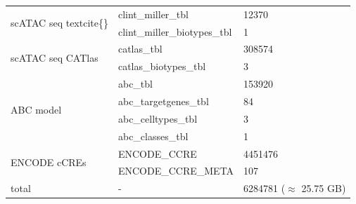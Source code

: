 \begin{table}[h!]
\begin{tabular}{l|l|l}
        \multirow{2}{*}{scATAC seq textcite\{\}}   & clint\_miller\_tbl                 & 12370                                                                                               \\
                                                   & clint\_miller\_biotypes\_tbl       & 1                                                                                                   \\ \hline
        \multirow{2}{*}{scATAC seq CATlas}         & catlas\_tbl                        & 308574                                                                                              \\
                                                   & catlas\_biotypes\_tbl              & 3                                                                                                   \\ \hline
        \multirow{4}{*}{ABC model}                 & abc\_tbl                           & 153920                                                                                              \\
                                                   & abc\_targetgenes\_tbl              & 84                                                                                                  \\
                                                   & abc\_celltypes\_tbl                & 3                                                                                                   \\
                                                   & abc\_classes\_tbl                  & 1                                                                                                   \\ \hline
        \multirow{2}{*}{ENCODE cCREs}              & ENCODE\_CCRE                       & 4451476                                                                                             \\
                                                   & ENCODE\_CCRE\_META                 & 107                                                                                                 \\ \hline
        total                                      & -                                  & 6284781 ($\approx$ 25.75 GB)
        \end{tabular}
    \end{table}

